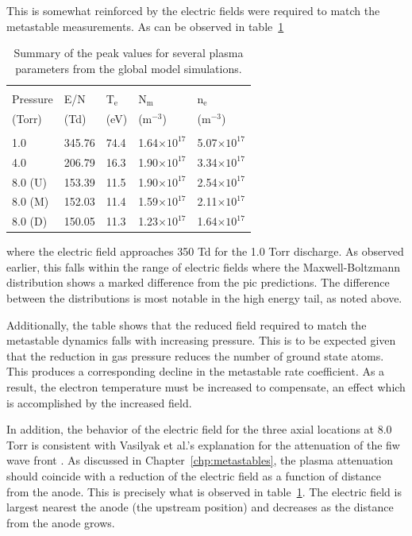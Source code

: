 This is somewhat reinforced by the electric fields were required to match the
metastable measurements. As can be observed in table~\ref{tbl:simsum}
\begin{table}
  \centering
  \caption{Summary of the peak values for several plasma parameters from the
  global model simulations.}
  \begin{tabular}{lllll}
    \toprule \\
    Pressure & E/N     & T$_\mathrm{e}$ & N$_\mathrm{m}$ & n$_\mathrm{e}$ \\
    (Torr)   & (Td)    & (eV)           & (m$^{-3}$)     & (m$^{-3}$) \\
    \midrule \\
    1.0      & 345.76  & 74.4  & 1.64$\times10^{17}$ & 5.07$\times10^{17}$ \\
    4.0      & 206.79  & 16.3  & 1.90$\times10^{17}$ & 3.34$\times10^{17}$ \\
    8.0 (U)  & 153.39  & 11.5  & 1.90$\times10^{17}$ & 2.54$\times10^{17}$ \\
    8.0 (M)  & 152.03  & 11.4  & 1.59$\times10^{17}$ & 2.11$\times10^{17}$ \\
    8.0 (D)  & 150.05  & 11.3  & 1.23$\times10^{17}$ & 1.64$\times10^{17}$ \\
    \bottomrule
  \end{tabular}
  \label{tbl:simsum}
\end{table}
where the electric field approaches 350 Td for the 1.0 Torr discharge. As
observed earlier, this falls within the range of electric fields where the
Maxwell-Boltzmann distribution shows a marked difference from the \acs{pic}
predictions. The difference between the distributions is most notable in the
high energy tail, as noted above. 

Additionally, the table shows that the reduced field required to match the
metastable dynamics falls with increasing pressure. This is to be expected given
that the reduction in gas pressure reduces the number of ground state atoms.
This produces a corresponding decline in the metastable rate coefficient. As a
result, the electron temperature must be increased to compensate, an effect
which is accomplished by the increased field.

In addition, the behavior of the electric field for the three axial locations at
8.0 Torr is consistent with Vasilyak et al.'s explanation for the attenuation of
the \acs{fiw} wave front \cite{Vasilyak1994}. As discussed in
Chapter~\ref{chp:metastables}, the plasma attenuation should coincide with a
reduction of the electric field as a function of distance from the anode. This
is precisely what is observed in table~\ref{tbl:simsum}. The electric field is
largest nearest the anode (the upstream position) and decreases as the distance
from the anode grows.

